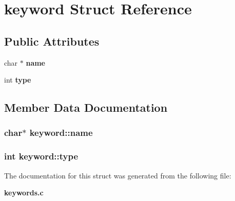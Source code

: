\section{keyword  Struct Reference}
\label{structkeyword}
\subsection*{Public Attributes}
\begin{CompactItemize}
\item 
char $\ast$ {\bf name}
\item 
int {\bf type}
\end{CompactItemize}


\subsection{Member Data Documentation}
\subsubsection{\setlength{\rightskip}{0pt plus 5cm}char$\ast$ keyword::name}\label{structkeyword_m0}


\subsubsection{\setlength{\rightskip}{0pt plus 5cm}int keyword::type}\label{structkeyword_m1}




The documentation for this struct was generated from the following file:\begin{CompactItemize}
\item 
{\bf keywords.c}\end{CompactItemize}
